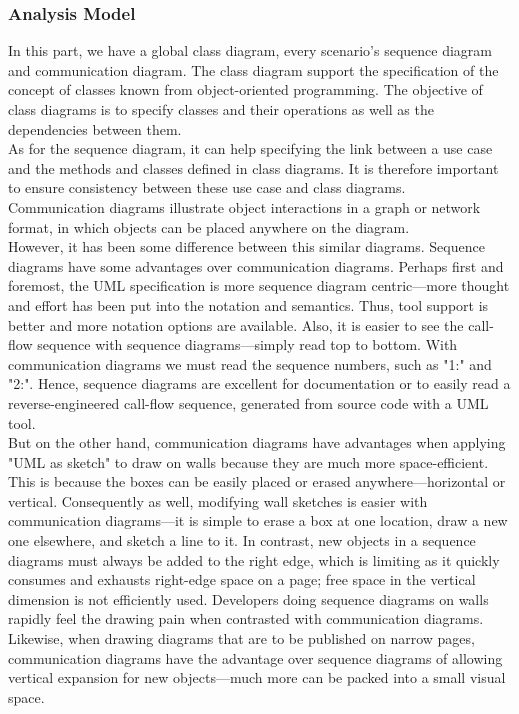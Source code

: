 \documentclass[12pt]{scrreprt}
\begin{document}
\subsubsection{Analysis Model}
In this part, we have a global class diagram, every scenario's sequence diagram and communication diagram. The class diagram support the specification of the concept of classes known from object-oriented programming. The objective of class diagrams is to specify classes and their operations as well as the dependencies between them.\\
As for the sequence diagram, it can help specifying the link between a use case and the methods and classes defined in class diagrams. It is therefore important to ensure consistency between these use case and class diagrams.\\
Communication diagrams illustrate object interactions in a graph or network format, in which objects can be placed anywhere on the diagram. \\
However, it has been some difference between this similar diagrams. Sequence diagrams have some advantages over communication diagrams. Perhaps first and foremost, the UML specification is more sequence diagram centric—more thought and effort has been put into the notation and semantics. Thus, tool support is better and more notation options are available. Also, it is easier to see the call-flow sequence with sequence diagrams—simply read top to bottom. With communication diagrams we must read the sequence numbers, such as "1:" and "2:". Hence, sequence diagrams are excellent for documentation or to easily read a reverse-engineered call-flow sequence, generated from source code with a UML tool.\\
But on the other hand, communication diagrams have advantages when applying "UML as sketch" to draw on walls because they are much more space-efficient. This is because the boxes can be easily placed or erased anywhere—horizontal or vertical. Consequently as well, modifying wall sketches is easier with communication diagrams—it is simple to erase a box at one location, draw a new one elsewhere, and sketch a line to it. In contrast, new objects in a sequence diagrams must always be added to the right edge, which is limiting as it quickly consumes and exhausts right-edge space on a page; free space in the vertical dimension is not efficiently used. Developers doing sequence diagrams on walls rapidly feel the drawing pain when contrasted with communication diagrams.\\
Likewise, when drawing diagrams that are to be published on narrow pages, communication diagrams have the advantage over sequence diagrams of allowing vertical expansion for new objects—much more can be packed into a small visual space.
\end{document}
